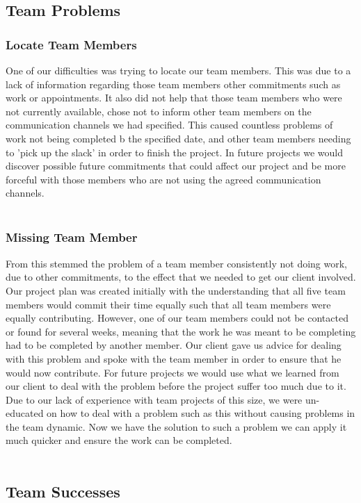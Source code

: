 \subsection{Team Problems}

\subsubsection{Locate Team Members}
One of our difficulties was trying to locate our team members. This was due to a lack of information regarding those team members other commitments such as work or appointments. It also did not help that those team members who were not currently available, chose not to inform other team members on the communication channels we had specified. This caused countless problems of work not being completed b the specified date, and other team members needing to 'pick up the slack' in order to finish the project. In future projects we would discover possible future commitments that could affect our project and be more forceful with those members who are not using the agreed communication channels.\\
\\
\subsubsection{Missing Team Member}
From this stemmed the problem of a team member consistently not doing work, due to other commitments, to the effect that we needed to get our client involved. Our project plan was created initially with the understanding that all five team members would commit their time equally such that all team members were equally contributing. However, one of our team members could not be contacted or found for several weeks, meaning that the work he was meant to be completing had to be completed by another member. Our client gave us advice for dealing with this problem and spoke with the team member in order to ensure that he would now contribute. For future projects we would use what we learned from our client to deal with the problem before the project suffer too much due to it. Due to our lack of experience with team projects of this size, we were un-educated on how to deal with a problem such as this without causing problems in the team dynamic. Now we have the solution to such a problem we can apply it much quicker and ensure the work can be completed. \\
\\

\subsection{Team Successes}

